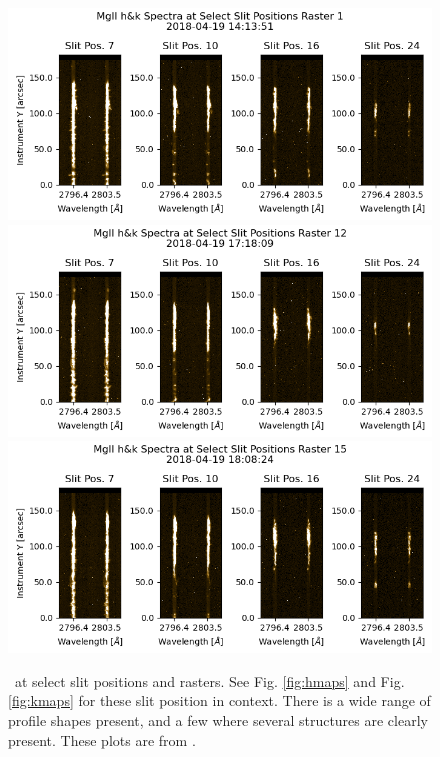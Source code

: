 \begin{figure}
    \centering
    \includegraphics[width=.85\linewidth]{./01Observations/figs/20180419/slit1.png}
    \includegraphics[width=.85\linewidth]{./01Observations/figs/20180419/slit12.png}
    \includegraphics[width=.85\linewidth]{./01Observations/figs/20180419/slit15.png}
    \caption[\mgiihk\ at select slit positions and rasters. See Fig. \ref{fig:hmaps} and Fig. \ref{fig:kmaps} for context.]{\mgiihk\ at select slit positions and rasters. See Fig. \ref{fig:hmaps} and Fig. \ref{fig:kmaps} for these slit position in context. There is a wide range of profile shapes present, and a few where several structures are clearly present. These plots are from \cite{peat_solar_2021}.}
    \label{spectra}
\end{figure}

